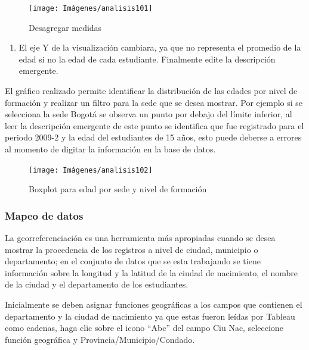 \documentclass[
]{book}
\providecommand{\tightlist}{%
  \setlength{\itemsep}{0pt}\setlength{\parskip}{0pt}}
\begin{document}
\begin{figure}

{\centering \texttt{[image: Imágenes/analisis101]} 

}

\caption{Desagregar medidas}\label{fig:paso8boxplot-fig}
\end{figure}

\begin{enumerate}
\def\labelenumi{\arabic{enumi}.}
\setcounter{enumi}{8}
\tightlist
\item
  El eje Y de la visualización cambiara, ya que no representa el promedio de la edad si no la edad de cada estudiante. Finalmente edite la descripción emergente.
\end{enumerate}

El gráfico realizado permite identificar la distribución de las edades por nivel de formación y realizar un filtro para la sede que se desea mostrar. Por ejemplo si se selecciona la sede Bogotá se observa un punto por debajo del límite inferior, al leer la descripción emergente de este punto se identifica que fue registrado para el periodo 2009-2 y la edad del estudiantes de 15 años, esto puede deberse a errores al momento de digitar la información en la base de datos.

\begin{figure}

{\centering \texttt{[image: Imágenes/analisis102]} 

}

\caption{Boxplot para edad por sede y nivel de formación}\label{fig:boxplot-fig}
\end{figure}

\hypertarget{mapeodatos}{%
\subsubsection{Mapeo de datos}\label{mapeodatos}}

La georreferenciación es una herramienta más apropiadas cuando se desea mostrar la procedencia de los registros a nivel de ciudad, municipio o departamento; en el conjunto de datos que se esta trabajando se tiene información sobre la longitud y la latitud de la ciudad de nacimiento, el nombre de la ciudad y el departamento de los estudiantes.

Inicialmente se deben asignar funciones geográficas a los campos que contienen el departamento y la ciudad de nacimiento ya que estas fueron leídas por Tableau como cadenas, haga clic sobre el icono ``Abc'' del campo Ciu Nac, seleccione función geográfica y Provincia/Municipio/Condado.
\end{document}

